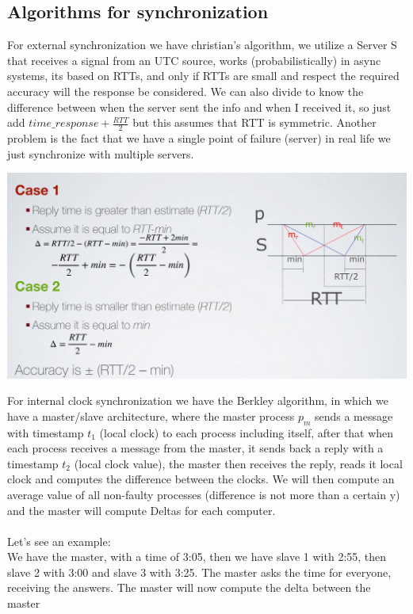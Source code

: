 \documentclass[11pt, a4paper]{article}
\begin{document}
\subsection{Algorithms for synchronization}
For external synchronization we have christian's algorithm, we utilize a Server S that receives a signal from an UTC source, works (probabilistically) in async systems, its based on RTTs, and only if RTTs are small and respect the required accuracy will the response be considered. We can also divide  to know the difference between when the server sent the info and when I received it, so just add $time\_ response + \frac{RTT}{2}$ but this assumes that RTT is symmetric.
Another problem is the fact that we have a single point of failure (server) in real life we just synchronize with multiple servers.
\begin{center}
    \includegraphics[scale=0.5]{img/synchro_algs/christian.png}
\end{center}
For internal clock synchronization we have the Berkley algorithm, in which we have a master/slave architecture,
where the master process $p_m$ sends a message with timestamp $t_1$ (local clock) to each process including itself, after that when each process receives a message from the master, it sends back a reply with a timestamp $t_2$ (local clock value), the master then receives the reply, reads it local clock and computes the difference between the clocks. We will then compute an average value of all non-faulty processes (difference is not more than a certain y) and the master will compute Deltas for each computer.\\
\\
Let's see an example:\\
We have the master, with a time of 3:05, then we have slave 1 with 2:55, then
slave 2 with 3:00 and slave 3 with 3:25. The master asks the time for everyone,
receiving the answers. The master will now compute the delta between the master
\end{document}
